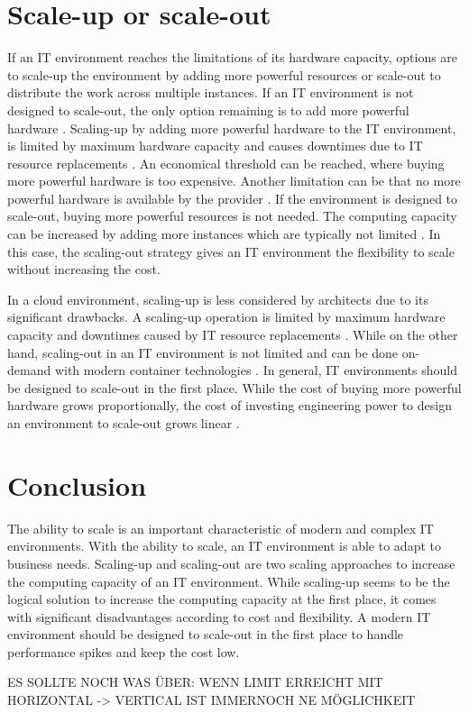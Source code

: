 \documentclass{article}
\begin{document}
\section{Scale-up or scale-out}
If an IT environment reaches the limitations of its hardware capacity, options are to scale-up the environment by adding more powerful resources or scale-out to distribute the work across multiple instances. If an IT environment is not designed to scale-out, the only option remaining is to add more powerful hardware \cite{Abbot2011ScalabilityRules}.
Scaling-up by adding more powerful hardware to the IT environment, is limited by maximum hardware capacity and causes downtimes due to IT resource replacements \cite{Mahmood2013CloudConcepts}. An economical threshold can be reached, where buying more powerful hardware is too expensive. Another limitation can be that no more powerful hardware is available by the provider \cite{Abbot2011ScalabilityRules}.
If the environment is designed to scale-out, buying more powerful resources is not needed. The computing capacity can be increased by adding more instances which are typically not limited \cite{Abbot2011ScalabilityRules}. In this case, the scaling-out strategy gives an IT environment the flexibility to scale without increasing the cost.


In a cloud environment, scaling-up is less considered by architects due to its significant drawbacks. A scaling-up operation is limited by maximum hardware capacity and downtimes caused by IT resource replacements \cite{Mahmood2013CloudConcepts}. While on the other hand, scaling-out in an IT environment is not limited and can be done on-demand with modern container technologies \cite{Abbot2011ScalabilityRules}. In general, IT environments should be designed to scale-out in the first place.  While the cost of buying more powerful hardware grows proportionally, the cost of investing engineering power to design an environment to scale-out grows linear \cite{Abbot2011ScalabilityRules}. 


\section{Conclusion}
The ability to scale is an important characteristic of modern and complex IT environments. With the ability to scale, an IT environment is able to adapt to business needs. Scaling-up and scaling-out are two scaling approaches to increase the computing capacity of an IT environment. While scaling-up seems to be the logical solution to increase the computing capacity at the first place, it comes with significant disadvantages according to cost and flexibility. A modern IT environment should be designed to scale-out in the first place to handle performance spikes and keep the cost low.

ES SOLLTE NOCH WAS ÜBER: WENN LIMIT ERREICHT MIT HORIZONTAL -> VERTICAL IST IMMERNOCH NE MÖGLICHKEIT


\pagebreak


\end{document}
